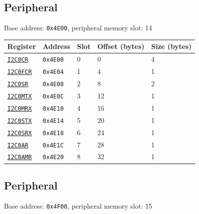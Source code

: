 \subsection{ Peripheral}
\noindent Base address: \texttt{0x4E00}, peripheral memory slot: 14

\begin{tabularx}{\textwidth}{ l l l l X }
\textbf{Register} & \textbf{Address} & \textbf{Slot} & \textbf{Offset (bytes)} & \textbf{Size (bytes)} \\ \hline
\hyperref[ss:I2CxCR]{\texttt{I2C0CR}} & \texttt{0x4E00} & 0 & 0 & 4 \\
\rowcolor{tablehighlightcolor} \hyperref[ss:I2CxFCR]{\texttt{I2C0FCR}} & \texttt{0x4E04} & 1 & 4 & 1 \\
\hyperref[ss:I2CxSR]{\texttt{I2C0SR}} & \texttt{0x4E08} & 2 & 8 & 2 \\
\rowcolor{tablehighlightcolor} \hyperref[ss:I2CxMTX]{\texttt{I2C0MTX}} & \texttt{0x4E0C} & 3 & 12 & 1 \\
\hyperref[ss:I2CxMRX]{\texttt{I2C0MRX}} & \texttt{0x4E10} & 4 & 16 & 1 \\
\rowcolor{tablehighlightcolor} \hyperref[ss:I2CxSTX]{\texttt{I2C0STX}} & \texttt{0x4E14} & 5 & 20 & 1 \\
\hyperref[ss:I2CxSRX]{\texttt{I2C0SRX}} & \texttt{0x4E18} & 6 & 24 & 1 \\
\rowcolor{tablehighlightcolor} \hyperref[ss:I2CxAR]{\texttt{I2C0AR}} & \texttt{0x4E1C} & 7 & 28 & 1 \\
\hyperref[ss:I2CxAMR]{\texttt{I2C0AMR}} & \texttt{0x4E20} & 8 & 32 & 1 \\
\hline
\end{tabularx}

\subsection{ Peripheral}
\noindent Base address: \texttt{0x4F00}, peripheral memory slot: 15

